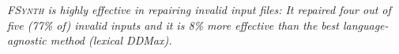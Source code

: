 \documentclass[sigconf,review,anonymous]{acmart}
\newenvironment{result}{\begin{framed}\centering\it}{\end{framed}}
\newcommand{\approach}{\textsc{FSynth}\xspace}
\newcommand{\ddmax}{\textit{DDMax}\xspace}
\begin{document}
\begin{result}
\approach is highly effective in repairing invalid input files: %
It repaired four out of five (77\% of) invalid inputs and it is %
8\% more effective than the best language-agnostic method (lexical \ddmax). %
\end{result}


\end{document}
